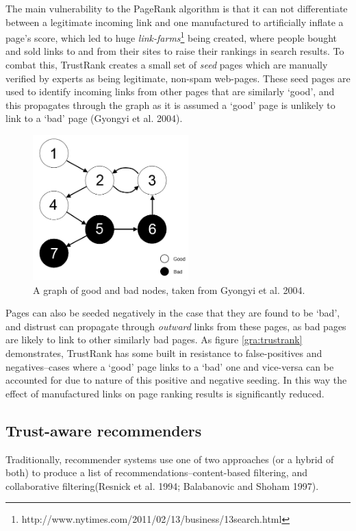 \documentclass[]{final_report}
\begin{document}
The main vulnerability to the PageRank algorithm is that it can not differentiate between a legitimate incoming link and one manufactured to artificially inflate a page's score, which led to huge \textsl{link-farms}\footnote{http://www.nytimes.com/2011/02/13/business/13search.html} being created, where people bought and sold links to and from their sites to raise their rankings in search results.  To combat this, TrustRank creates a small set of \textsl{seed} pages which are manually verified by experts as being legitimate, non-spam web-pages. These seed pages are used to identify incoming links from other pages that are similarly `good', and this propagates through the graph as it is assumed a `good' page is unlikely to link to a `bad' page (Gyongyi et al. 2004).

\begin{figure}[ht!]
\centering
\includegraphics[width=60mm]{chap2/trustrank.png}
\caption{A graph of good and bad nodes, taken from Gyongyi et al. 2004.}
\end{figure}\label{gra:trustrank}

Pages can also be seeded negatively in the case that they are found to be `bad', and distrust can propagate through \textsl{outward} links from these pages, as bad pages are likely to link to other similarly bad pages. As figure \ref{gra:trustrank} demonstrates, TrustRank has some built in resistance to false-positives and negatives--cases where a `good' page links to a `bad' one and vice-versa can be accounted for due to nature of this positive and negative seeding. In this way the effect of manufactured links on page ranking results is significantly reduced.

\subsection{Trust-aware recommenders}

Traditionally, recommender systems use one of two approaches (or a hybrid of both) to produce a list of recommendations--content-based filtering, and collaborative filtering(Resnick et al. 1994; Balabanovic and Shoham 1997). 
\end{document}
